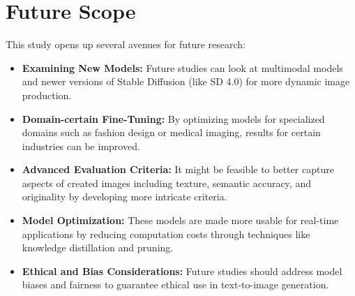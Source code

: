 \documentclass{article}
\begin{document}


\section{Future Scope}
This study opens up several avenues for future research:
\begin{itemize}
    \item \textbf{Examining New Models:} Future studies can look at multimodal models and newer versions of Stable Diffusion (like SD 4.0) for more dynamic image production.
    \item \textbf{Domain-certain Fine-Tuning:} By optimizing models for specialized domains such as fashion design or medical imaging, results for certain industries can be improved.
    \item \textbf{Advanced Evaluation Criteria:} It might be feasible to better capture aspects of created images including texture, semantic accuracy, and originality by developing more intricate criteria.
    \item \textbf{Model Optimization:} These models are made more usable for real-time applications by reducing computation costs through techniques like knowledge distillation and pruning.
    \item \textbf{Ethical and Bias Considerations:} Future studies should address model biases and fairness to guarantee ethical use in text-to-image generation.
\end{itemize}
\end{document}
